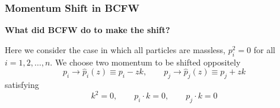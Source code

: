 \documentclass{beamer}
\begin{document}
\begin{frame}
    \frametitle{Momentum Shift in BCFW}
    \textbf{What did BCFW do to make the shift?}

    Here we consider the case in which all particles are massless, $p_i^2 = 0$ for all $i = 1, 2, \dotsc, n$. We choose two momentum to be shifted oppositely 
    \begin{equation*}
        p_i\rightarrow\hat{p}_i(z)\equiv p_i-zk,\qquad p_j\rightarrow\hat{p}_j(z)\equiv p_j+zk
    \end{equation*}
    satisfying 
    \begin{equation*}
        k^2=0,\qquad p_i\cdot k=0,\qquad p_j\cdot k=0
    \end{equation*}

\begin{figure}
    \centering
    \begin{minipage}{0.45\textwidth}

\begin{tikzpicture}[scale=0.7,x=0.75pt,y=0.75pt,yscale=-1,xscale=1]


\end{tikzpicture}
\end{minipage}
\end{figure}
\end{frame}
\end{document}
